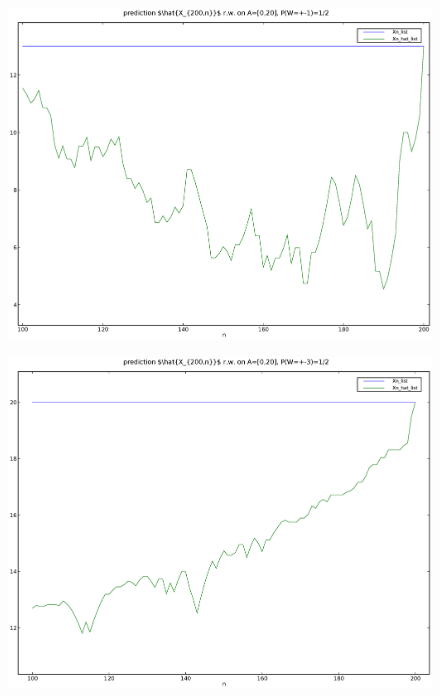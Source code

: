 \documentclass[a4paper,10pt]{article}
\begin{document}
\begin{figure}[p]
\includegraphics[width=1\textwidth]{hw6_1_b_K_20_L_1_T_200.eps}
\caption{}\label{f2}
\end{figure}

\begin{figure}[p]
\includegraphics[width=1\textwidth]{hw6_1_b_K_20_L_3_T_200.eps}
\caption{}\label{f3}
\end{figure}
\end{document}
